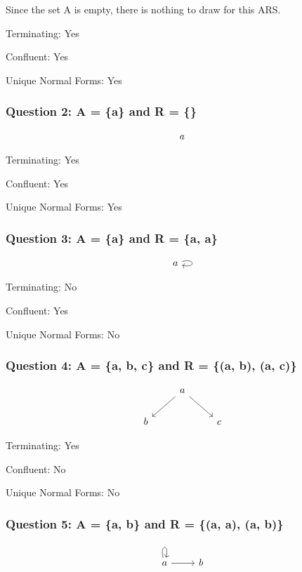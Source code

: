 \documentclass{article}
\theoremstyle{theorem}
\theoremstyle{definition}
\theoremstyle{remark}
\begin{document}
Since the set A is empty, there is nothing to draw for this ARS.

Terminating: Yes 

Confluent: Yes

Unique Normal Forms: Yes

\subsubsection*{Question 2: A = \{a\} and R = \{\}}

\[
\begin{tikzcd}
a
\end{tikzcd}
\]

Terminating: Yes

Confluent: Yes 

Unique Normal Forms: Yes

\subsubsection*{Question 3: A = \{a\} and R = \{a, a\}}

\[
\begin{tikzcd}
a \arrow[loop right]{}
\end{tikzcd}
\]

Terminating: No

Confluent: Yes 

Unique Normal Forms: No

\subsubsection*{Question 4: A = \{a, b, c\} and R = \{(a, b), (a, c)\}}

\[
\begin{tikzcd}
& a \arrow[ld] \arrow[rd] & \\
b & & c
\end{tikzcd}
\]

Terminating: Yes

Confluent: No

Unique Normal Forms: No

\subsubsection*{Question 5: A = \{a, b\} and R = \{(a, a), (a, b)\}}

\[
\begin{tikzcd}
a \arrow[loop above]{} \arrow[r] & b
\end{tikzcd}
\]
\end{document}
